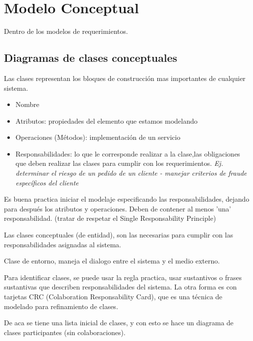 \documentclass[titlepage,a4paper]{article}
\begin{document}
\section{Modelo Conceptual}
Dentro de los modelos de requerimientos.

\subsection{Diagramas de clases conceptuales}
Las clases representan los bloques de construcción mas importantes de cualquier sistema.

\begin{itemize}
    \item Nombre
    \item Atributos: propiedades del elemento que estamos modelando
    \item Operaciones (Métodos): implementación de un servicio
    \item Responsabilidades: lo que le corresponde realizar a la clase,las obligaciones que deben realizar las clases para cumplir con los requerimientos. \textit{Ej. determinar el riesgo de un pedido de un cliente - manejar criterios de fraude específicos del cliente}
\end{itemize}


Es buena practica iniciar el modelaje especificando las responsabilidades, dejando para después los atributos y operaciones. Deben de contener al menos 'una' responsabilidad. (tratar de respetar el Single Responsability Principle)

Las clases conceptuales (de entidad), son las necesarias para cumplir con las responsabilidades asignadas al sistema.

Clase de entorno, maneja el dialogo entre el sistema y el medio externo.

Para identificar clases, se puede usar la regla practica, usar sustantivos o frases sustantivas que describen responsabilidades del sistema. La otra forma es con tarjetas CRC (Colaboration Responsability Card), que es una técnica de modelado para refinamiento de clases.

De aca se tiene una lista inicial de clases, y con esto se hace un diagrama de clases participantes (sin colaboraciones).
\end{document}
